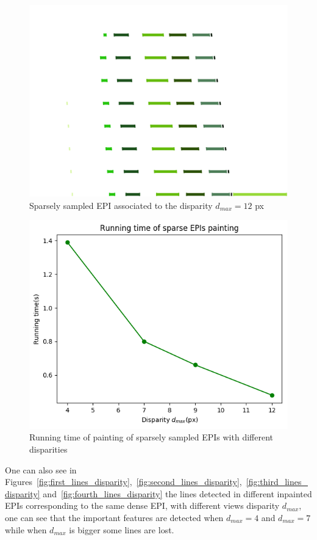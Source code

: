 \begin{itemize}
\begin{figure}[h!]
\centering
\includegraphics[width = 0.7 \textwidth]{./Diagrams/results/Disparity_benchmark/673_10_102_12_48_8_sparse.png}
\caption{Sparsely sampled EPI associated to the disparity $d_{max}=12$ px}
\label{fig:fourth_sparse_disparity}
\end{figure}

\begin{figure}[h!]
\centering
\includegraphics[width = 0.7 \textwidth]{./Diagrams/results/Disparity_benchmark/sparse_painting_benchmark.png}
\caption{Running time of painting of sparsely sampled EPIs with different disparities}
\label{fig:benchmark_line}
\end{figure}


\bigskip

One can also see in Figures~\ref{fig:first_lines_disparity},~\ref{fig:second_lines_disparity},~\ref{fig:third_lines_disparity} and~\ref{fig:fourth_lines_disparity} the lines detected in different inpainted EPIs corresponding to the same dense EPI, with different views disparity $d_{max}$, one can see that the important features are detected when $d_{max}=4$ and $d_{max}=7$ while when $d_{max}$ is bigger some lines are lost. 


\end{itemize}
